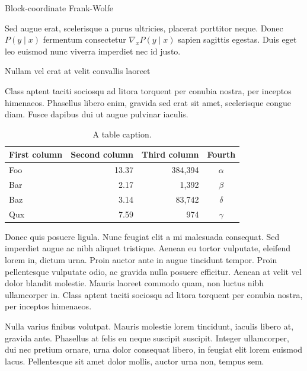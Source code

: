 \documentclass[final]{beamer}
\newlength{\colwidth}
\begin{document}
\begin{frame}[t]
\begin{columns}[t]
\begin{column}{\colwidth}
\begin{block}{Block-coordinate Frank-Wolfe}

    Sed augue erat, scelerisque a purus ultricies, placerat porttitor neque.
    Donec $P(y \mid x)$ fermentum consectetur $\nabla_x P(y \mid x)$ sapien
    sagittis egestas. Duis eget leo euismod nunc viverra imperdiet nec id
    justo.

  \end{block}

  \begin{block}{Nullam vel erat at velit convallis laoreet}

    Class aptent taciti sociosqu ad litora torquent per conubia nostra, per
    inceptos himenaeos. Phasellus libero enim, gravida sed erat sit amet,
    scelerisque congue diam. Fusce dapibus dui ut augue pulvinar iaculis.

    \begin{table}
      \centering
      \begin{tabular}{l r r c}
        \toprule
        \textbf{First column} & \textbf{Second column} & \textbf{Third column} & \textbf{Fourth} \\
        \midrule
        Foo & 13.37 & 384,394 & $\alpha$ \\
        Bar & 2.17 & 1,392 & $\beta$ \\
        Baz & 3.14 & 83,742 & $\delta$ \\
        Qux & 7.59 & 974 & $\gamma$ \\
        \bottomrule
      \end{tabular}
      \caption{A table caption.}
    \end{table}

    Donec quis posuere ligula. Nunc feugiat elit a mi malesuada consequat. Sed
    imperdiet augue ac nibh aliquet tristique. Aenean eu tortor vulputate,
    eleifend lorem in, dictum urna. Proin auctor ante in augue tincidunt
    tempor. Proin pellentesque vulputate odio, ac gravida nulla posuere
    efficitur. Aenean at velit vel dolor blandit molestie. Mauris laoreet
    commodo quam, non luctus nibh ullamcorper in. Class aptent taciti sociosqu
    ad litora torquent per conubia nostra, per inceptos himenaeos.

    Nulla varius finibus volutpat. Mauris molestie lorem tincidunt, iaculis
    libero at, gravida ante. Phasellus at felis eu neque suscipit suscipit.
    Integer ullamcorper, dui nec pretium ornare, urna dolor consequat libero,
    in feugiat elit lorem euismod lacus. Pellentesque sit amet dolor mollis,
    auctor urna non, tempus sem.


\end{block}
\end{column}
\end{columns}
\end{frame}
\end{document}
